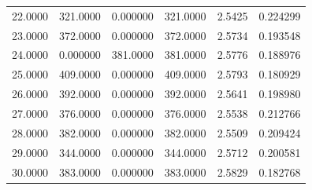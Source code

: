 \documentclass[11pt]{report}
\begin{document}
\begin{longtable}{llllll}
22.0000 & 321.0000 & 0.000000 & 321.0000 & 2.5425 & 0.224299 \\
23.0000 & 372.0000 & 0.000000 & 372.0000 & 2.5734 & 0.193548 \\
24.0000 & 0.000000 & 381.0000 & 381.0000 & 2.5776 & 0.188976 \\
25.0000 & 409.0000 & 0.000000 & 409.0000 & 2.5793 & 0.180929 \\
26.0000 & 392.0000 & 0.000000 & 392.0000 & 2.5641 & 0.198980 \\
27.0000 & 376.0000 & 0.000000 & 376.0000 & 2.5538 & 0.212766 \\
28.0000 & 382.0000 & 0.000000 & 382.0000 & 2.5509 & 0.209424 \\
29.0000 & 344.0000 & 0.000000 & 344.0000 & 2.5712 & 0.200581 \\
30.0000 & 383.0000 & 0.000000 & 383.0000 & 2.5829 & 0.182768 \\
\bottomrule
\end{longtable}
\end{document}
